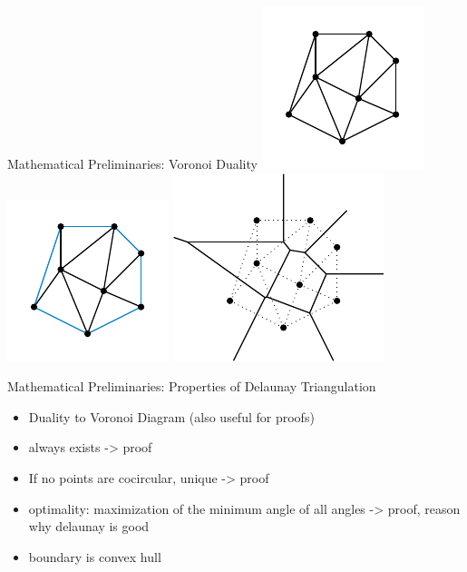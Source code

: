 \documentclass[aspectratio=169]{beamer}
\begin{document}
\begin{frame}{Mathematical Preliminaries: Voronoi Duality}
  \includegraphics{figures/delaunay-triangulation.pdf}
  \includegraphics{figures/delaunay-triangulation-convex-hull.pdf}
  \includegraphics{figures/delaunay-triangulation-voronoi.pdf}
\end{frame}

\begin{frame}{Mathematical Preliminaries: Properties of Delaunay Triangulation}
  \begin{itemize}
    \item Duality to Voronoi Diagram (also useful for proofs)
    \item always exists -> proof
    \item If no points are cocircular, unique -> proof
    \item optimality: maximization of the minimum angle of all angles -> proof, reason why delaunay is good
    \item boundary is convex hull
  \end{itemize}
\end{frame}
\end{document}
